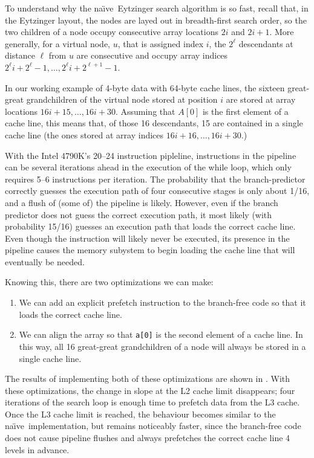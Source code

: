 \documentclass{patmorin}
\newcommand{\naive}{na\"{\i}ve}
\begin{document}
To understand why the \naive\ Eytzinger search algorithm is so
fast, recall that, in the Eytzinger layout, the nodes are layed out
in breadth-first search order,  so the two children of a node occupy
consecutive array locations $2i$ and $2i+1$. More generally, for a
virtual node, $u$, that is assigned index $i$, the $2^\ell$ descendants at
distance $\ell$ from $u$ are consecutive and occupy array indices $2^\ell
i + 2^{\ell}-1,\ldots,2^{\ell} i + 2^{\ell+1}-1$.

In our working example of 4-byte data with 64-byte cache lines,
the sixteen great-great grandchildren of the virtual node stored at
position $i$ are stored at array locations $16i+15,\ldots,16i+30$.
Assuming that $A[0]$ is the first element of a cache line, this means
that, of those 16 descendants, 15 are contained in a single cache line
(the ones stored at array indices $16i+16,\ldots,16i+30$.)

With the Intel 4790K's 20--24 instruction pipleline, instructions
in the pipeline can be several iterations ahead in the execution of
the while loop, which only requires 5--6 instructions per iteration.
The probability that the branch-predictor correctly guesses the execution
path of four consecutive stages is only about 1/16, and a flush of (some
of) the pipeline is likely.  However, even if the branch predictor does
not guess the correct execution path, it most likely (with probability
15/16) guesses an execution path that loads the correct cache line.
Even though the instruction will likely never be executed, its presence
in the pipeline causes the memory subystem to begin loading the cache
line that will eventually be needed.

Knowing this, there are two optimizations we can make:
\begin{enumerate}
  \item We can add an explicit prefetch instruction to the branch-free code
    so that it loads the correct cache line.
  \item We can align the array so that \texttt{a[0]} is the
    second element of a cache line.  In this way, all 16 great-great
    grandchildren of a node will always be stored in a single cache line.
\end{enumerate}

The results of implementing both of these optimizations are shown in
.  With these optimizations, the change in slope
at the L2 cache limit disappears; four iterations of the search loop
is enough time to prefetch data from the L3 cache.  Once the L3 cache
limit is reached, the behaviour becomes similar to the \naive\
implementation, but remains noticeably faster, since the branch-free
code does not cause pipeline flushes and always prefetches the correct
cache line 4 levels in advance.
\end{document}
